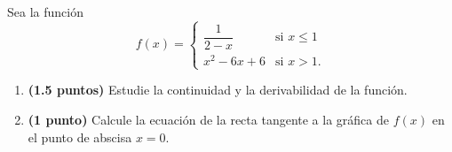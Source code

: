 
Sea la función
\[
f(x)=\begin{cases}
\dfrac{1}{2-x} & \text{si }x\leq1\\[6pt]
x^2-6x+6 & \text{si }x>1.
\end{cases}
\]
\begin{enumerate}[label=\alph*)]
\item \textbf{(1.5 puntos)} Estudie la continuidad y la derivabilidad de la función.
\item \textbf{(1 punto)} Calcule la ecuación de la recta tangente a la gráfica de $f(x)$ en el punto de abscisa $x=0$.
\end{enumerate}
